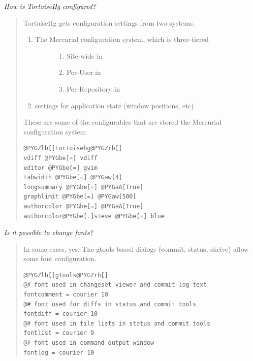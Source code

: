 \documentclass[letterpaper,10pt,english]{manual}
\begin{document}
\emph{How is TortoiseHg configured?}
\begin{quote}

TortoiseHg gets configuration settings from two systems.
\begin{enumerate}
\item {} \begin{description}
\item[The Mercurial configuration system, which is three-tiered]\begin{enumerate}
\item {} 
Site-wide  in 

\item {} 
Per-User  in 

\item {} 
Per-Repository  in 

\end{enumerate}

\end{description}

\item {} 
 settings for application state
(window positions, etc)

\end{enumerate}

These are some of the configurables that are stored the Mercurial
configuration system.

\begin{Verbatim}[commandchars=@\[\]]
@PYGZlb[]tortoisehg@PYGZrb[]
vdiff @PYGbe[=] vdiff
editor @PYGbe[=] gvim
tabwidth @PYGbe[=] @PYGaw[4]
longsummary @PYGbe[=] @PYGaA[True]
graphlimit @PYGbe[=] @PYGaw[500]
authorcolor @PYGbe[=] @PYGaA[True]
authorcolor@PYGbe[.]steve @PYGbe[=] blue
\end{Verbatim}
\end{quote}

\emph{Is it possible to change fonts?}
\begin{quote}

In some cases, yes. The gtools based dialogs (commit, status,
shelve) allow some font configuration.

\begin{Verbatim}[commandchars=@\[\]]
@PYGZlb[]gtools@PYGZrb[]
@# font used in changeset viewer and commit log text
fontcomment = courier 10
@# font used for diffs in status and commit tools
fontdiff = courier 10
@# font used in file lists in status and commit tools
fontlist = courier 9
@# font used in command output window
fontlog = courier 10
\end{Verbatim}
\end{quote}
\end{document}
